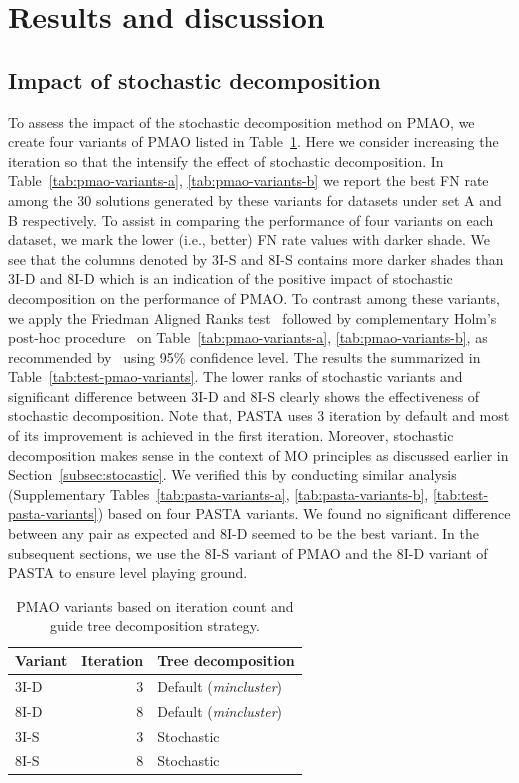 \section{Results and discussion}
\label{sec:experiment}

\subsection{Impact of stochastic decomposition}
To assess the impact of the stochastic decomposition method on PMAO, we create four variants of PMAO listed in Table~\ref{tab:variants}. Here we consider increasing the iteration so that the intensify the effect of stochastic decomposition. In Table~\ref{tab:pmao-variants-a},  \ref{tab:pmao-variants-b} we report the best FN rate among the 30 solutions generated by these variants for datasets under set A and B respectively. To assist in comparing the performance of four variants on each dataset, we mark the lower (i.e., better) FN rate values with darker shade. We see that the columns denoted by 3I-S and 8I-S contains more darker shades than 3I-D and 8I-D which is an indication of the positive impact of stochastic decomposition on the performance of PMAO. To contrast among these variants, we apply the Friedman Aligned Ranks test~\cite{hodges2012rank} followed by complementary Holm’s post-hoc procedure~\cite{holm1979simple} on Table~\ref{tab:pmao-variants-a},  \ref{tab:pmao-variants-b}, as recommended by~\cite{derrac2011practical} using 95\% confidence level. The results the summarized in Table~\ref{tab:test-pmao-variants}. The lower ranks of stochastic variants and significant difference between 3I-D and 8I-S clearly shows the effectiveness of stochastic decomposition. Note that, PASTA uses 3 iteration by default and most of its improvement is achieved in the first iteration. Moreover, stochastic decomposition makes sense in the context of MO principles as discussed earlier in Section~\ref{subsec:stocastic}. We verified this by conducting similar analysis (Supplementary Tables~\ref{tab:pasta-variants-a}, \ref{tab:pasta-variants-b},  \ref{tab:test-pasta-variants}) based on four PASTA variants. We found no significant difference between any pair as expected and 8I-D seemed to be the best variant. In the subsequent sections, we use the 8I-S variant of PMAO and the 8I-D variant of PASTA to ensure level playing ground.

\begin{table}[!htbp]
	\small
	\caption{PMAO variants based on iteration count and guide tree decomposition strategy. }
	\begin{tabular}{l|r|l}
		Variant & Iteration & Tree decomposition\\
		\hline
		3I-D  & 3     & Default (\textit{mincluster}) \\
		\hline
		8I-D  & 8     & Default (\textit{mincluster}) \\
		\hline
		3I-S  & 3     & Stochastic \\
		\hline
		8I-S  & 8     & Stochastic\\
	\end{tabular}%
	\label{tab:variants}%
\end{table}%

